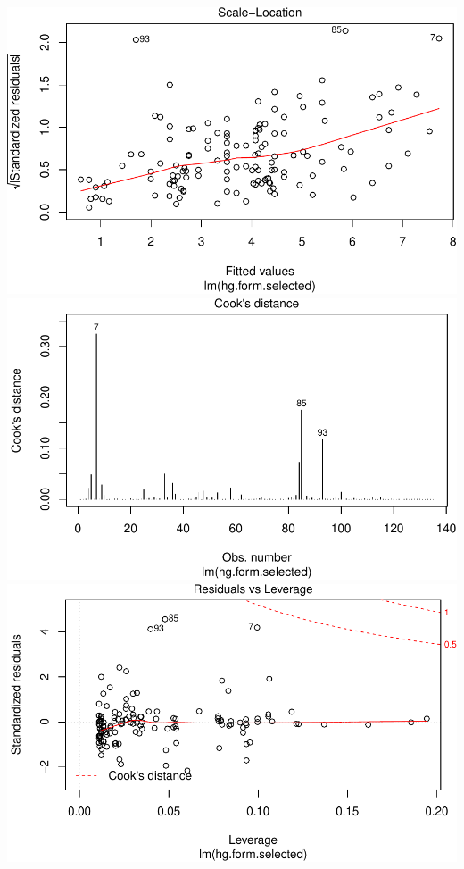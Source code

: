 \documentclass[12pt,]{article}
\begin{document}
\includegraphics{Report_files/figure-latex/unnamed-chunk-16-4.pdf}
\includegraphics{Report_files/figure-latex/unnamed-chunk-16-5.pdf}
\includegraphics{Report_files/figure-latex/unnamed-chunk-16-6.pdf}
\end{document}
